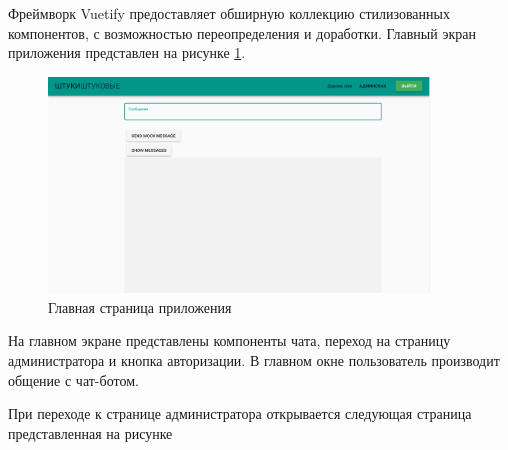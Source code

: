 Фреймворк Vuetify предоставляет обширную коллекцию стилизованных компонентов, с возможностью переопределения и доработки. Главный экран приложения представлен на рисунке \ref{fig:main_page}. 
\begin{figure}[H]
    \centering
    \includegraphics[width=0.9\textwidth]{image/main_page.png}
    \caption{Главная страница приложения}
    \label{fig:main_page}
\end{figure}

На главном экране представлены компоненты чата, переход на страницу администратора и кнопка авторизации. В главном окне пользователь производит общение с чат-ботом. 

При переходе к странице администратора открывается следующая страница представленная на рисунке 

